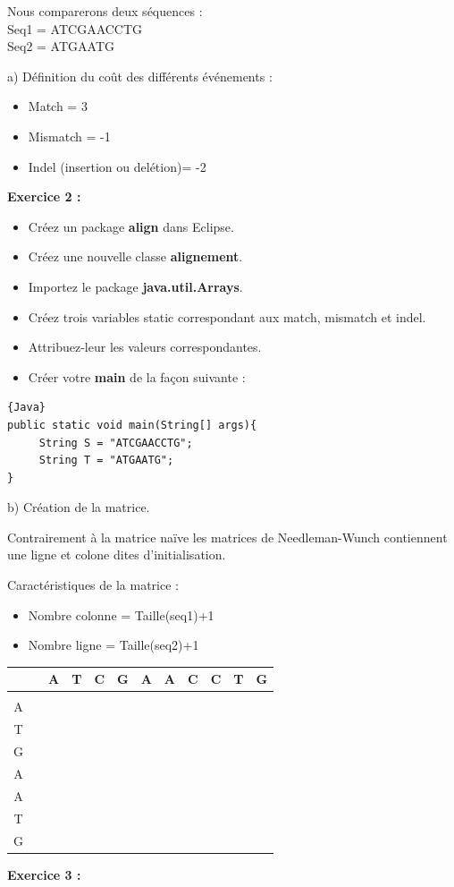 \documentclass{article}
\begin{document}
Nous comparerons deux séquences :\\
Seq1 = ATCGAACCTG \\
Seq2 = ATGAATG
\medbreak

a) Définition du coût des différents événements :
\begin{itemize}
\item Match = 3
\item Mismatch = -1
\item Indel (insertion ou delétion)= -2
\end{itemize}

\medbreak
\textbf {Exercice 2 :}
\begin{itemize}
\item Créez un package \textbf{align} dans Eclipse.
\item Créez une nouvelle classe \textbf{alignement}.
\item Importez le package \textbf{java.util.Arrays}.
\item Créez trois variables static correspondant aux match, mismatch et indel.
\item Attribuez-leur les valeurs correspondantes.
\item Créer votre \textbf{main} de la façon suivante :
\end{itemize}

\begin{lstlisting}{Java}
public static void main(String[] args){
	 String S = "ATCGAACCTG";
	 String T = "ATGAATG";
} 
\end{lstlisting}

b)  Création de la matrice.

Contrairement à la matrice naïve les matrices de Needleman-Wunch contiennent une ligne et colone dites d'initialisation.

Caractéristiques de la matrice :
\begin{itemize}
\item Nombre colonne = Taille(seq1)+1
\item Nombre ligne = Taille(seq2)+1
\end{itemize}


\begin{center}
\begin{tabular}{|c|c|c|c|c|c|c|c|c|c|c|c|}
\hline
 &&A&T&C&G&A&A&C&C&T&G\\
\hline
 & & & & & & & & & & & \\
\hline
A& & & & & & & & & & & \\
\hline
T& & & & & & & & & & & \\
\hline
G& & & & & & & & & & & \\
\hline
A& & & & & & & & & & & \\
\hline
A& & & & & & & & & & & \\
\hline
T& & & & & & & & & & & \\
\hline
G& & & & & & & & & & & \\
\hline
\end{tabular}
\end{center}
\medbreak
\textbf{Exercice 3 :} 
\end{document}
